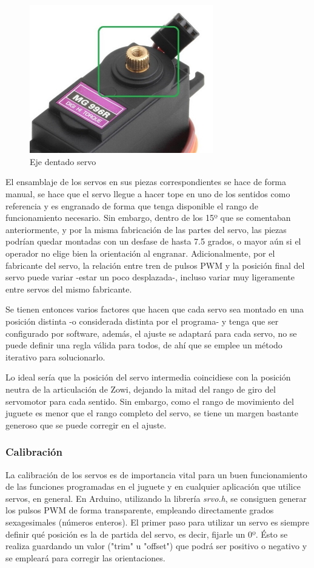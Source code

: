\begin{figure}
\centering
\includegraphics[width=80mm]{Figures/servo-shft.jpg}
\caption[Eje dentado servo]{Eje dentado servo}
\label{fig:EjeServo}
\end{figure}

El ensamblaje de los servos en sus piezas correspondientes se hace de forma manual, se hace que el servo llegue a hacer tope en uno de los sentidos como referencia y es engranado de forma que tenga disponible el rango de funcionamiento necesario. Sin embargo, dentro de los 15º que se comentaban anteriormente, y por la misma fabricación de las partes del servo, las piezas podrían quedar montadas con un desfase de hasta 7.5 grados, o mayor aún si el operador no elige bien la orientación al engranar. Adicionalmente, por el fabricante del servo, la relación entre tren de pulsos PWM y la posición final del servo puede variar -estar un poco desplazada-, incluso variar muy ligeramente entre servos del mismo fabricante.

Se tienen entonces varios factores que hacen que cada servo sea montado en una posición distinta -o considerada distinta por el programa- y tenga que ser configurado por software, además, el ajuste se adaptará para cada servo, no se puede definir una regla válida para todos, de ahí que se emplee un método iterativo para solucionarlo.

Lo ideal sería que la posición del servo intermedia coincidiese con la posición neutra de la articulación de Zowi, dejando la mitad del rango de giro del servomotor para cada sentido. Sin embargo, como el rango de movimiento del juguete es menor que el rango completo del servo, se tiene un margen bastante generoso que se puede corregir en el ajuste.

\subsubsection{Calibración}
La calibración de los servos es de importancia vital para un buen funcionamiento de las funciones programadas en el juguete y en cualquier aplicación que utilice servos, en general. En Arduino, utilizando la librería \textit{srvo.h}, se consiguen generar los pulsos PWM de forma transparente, empleando directamente grados sexagesimales (números enteros). El primer paso para utilizar un servo es siempre definir qué posición es la de partida del servo, es decir, fijarle un 0º. Ésto se realiza guardando un valor ("trim" u "offset") que podrá ser positivo o negativo y se empleará para corregir las orientaciones.

